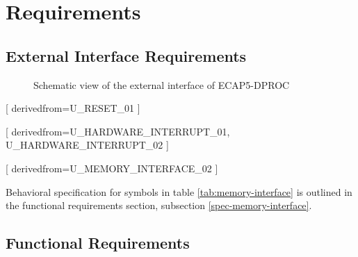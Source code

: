 \section{Requirements}

\subsection{External Interface Requirements}

\begin{figure}[h!]
    \centering
    
    \caption{Schematic view of the external interface of ECAP5-DPROC}
    \label{fig:externalinterface}
\end{figure}

\begin{table}[H]
  \centering
  
  \caption{ECAP5-DPROC control signals}
  \label{tab:control-interface}
\end{table}

\begin{table}[H]
  \centering
  
  \caption{ECAP5-DPROC memory interface signals}
  \label{tab:memory-interface}
\end{table}


[
  derivedfrom=U\_RESET\_01
]


[
  derivedfrom={U\_HARDWARE\_INTERRUPT\_01, U\_HARDWARE\_INTERRUPT\_02}
]


[
  derivedfrom=U\_MEMORY\_INTERFACE\_02
]

\begin{content}
  Behavioral specification for symbols in table \ref{tab:memory-interface} is outlined in the functional requirements section, subsection \ref{spec-memory-interface}.
\end{content}

\subsection{Functional Requirements}

